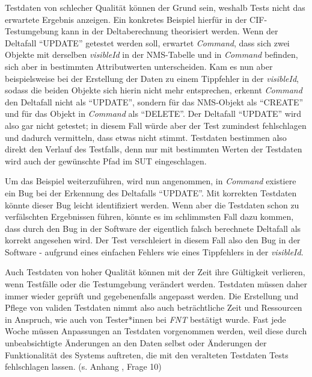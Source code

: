 Testdaten von schlecher Qualität können der Grund sein, weshalb Tests nicht das erwartete Ergebnis anzeigen. \cite[S. 137]{oregan:2019} Ein konkretes Beispiel hierfür in der \ac{CIF}-Testumgebung kann in der Deltaberechnung theorisiert werden. Wenn der Deltafall \enquote{UPDATE} getestet werden soll, erwartet \textit{Command}, dass sich zwei Objekte mit derselben \textit{visibleId} in der \ac{NMS}-Tabelle und in \textit{Command} befinden, sich aber in bestimmten Attributwerten unterscheiden. Kam es nun aber beispielsweise bei der Erstellung der Daten zu einem Tippfehler in der \textit{visibleId}, sodass die beiden Objekte sich hierin nicht mehr entsprechen, erkennt \textit{Command} den Deltafall nicht als \enquote{UPDATE}, sondern für das \ac{NMS}-Objekt als \enquote{CREATE} und für das Objekt in \textit{Command} als \enquote{DELETE}. Der Deltafall \enquote{UPDATE} wird also gar nicht getestet; in diesem Fall würde aber der Test zumindest fehlschlagen und dadurch vermitteln, dass etwas nicht stimmt. Testdaten bestimmen also direkt den Verlauf des Testfalls, denn nur mit bestimmten Werten der Testdaten wird auch der gewünschte Pfad im \ac{SUT} eingeschlagen. \cite[S. 221]{witte:2019}

Um das Beispiel weiterzuführen, wird nun angenommen, in \textit{Command} existiere ein Bug bei der Erkennung des Deltafalls \enquote{UPDATE}. Mit korrekten Testdaten könnte dieser Bug leicht identifiziert werden. Wenn aber die Testdaten schon zu verfälschten Ergebnissen führen, könnte es im schlimmsten Fall dazu kommen, dass durch den Bug in der Software der eigentlich falsch berechnete Deltafall als korrekt angesehen wird. Der Test verschleiert in diesem Fall also den Bug in der Software - aufgrund eines einfachen Fehlers wie eines Tippfehlers in der \textit{visibleId}.

Auch Testdaten von hoher Qualität können mit der Zeit ihre Gültigkeit verlieren, wenn Testfälle oder die Testumgebung verändert werden. Testdaten müssen daher immer wieder geprüft und gegebenenfalls angepasst werden. \cite[S. 121f.]{witte:2019} Die Erstellung und Pflege von validen Testdaten nimmt also auch beträchtliche Zeit und Ressourcen in Anspruch, wie auch von Tester*innen bei \textit{FNT} bestätigt wurde. Fast jede Woche müssen Anpassungen an Testdaten vorgenommen werden, weil diese durch unbeabsichtigte Änderungen an den Daten selbst oder Änderungen der Funktionalität des Systems auftreten, die mit den veralteten Testdaten Tests fehlschlagen lassen. (s. Anhang , Frage 10)

